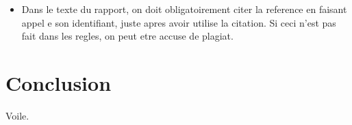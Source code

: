 \begin{spacing}{1.2}
\begin{itemize}
\begin{itemize}
\begin{description}
[en ligne]. Universite du Michigan, Etats Unis. Site disponible sur :\\
http://www.lib.umich.edu/megasite/critlist.html.(Page consultee le 11/09/1998).
\end{description}
\item Dans le texte du rapport, on doit obligatoirement citer la reference en  faisant appel e son identifiant, juste apres avoir utilise la citation. Si ceci n'est pas fait dans les regles, on peut etre accuse de plagiat.
\end{itemize} 
\end{itemize} 

\section*{Conclusion}
Voile.

\end{spacing}
